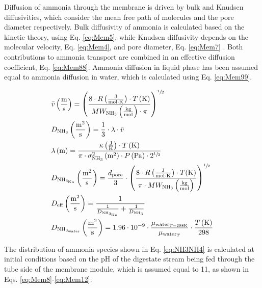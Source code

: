 \begin{refsection}[referencesApD]
Diffusion of ammonia through the membrane is driven by bulk and Knudsen diffusivities, which consider the mean free path of molecules and the pore diameter respectively. Bulk diffusivity of ammonia is calculated based on the kinetic theory, using Eq. \ref{eq:Mem5}, while Knudsen diffusivity depends on the molecular velocity, Eq. \ref{eq:Mem4}, and pore diameter, Eq. \ref{eq:Mem7} \citet{agrahari2012model}. Both contributions to ammonia transport are combined in an effective diffusion coefficient, Eq. \ref{eq:Mem88}. Ammonia diffusion in liquid phase has been assumed equal to ammonia diffusion in water, which is calculated using Eq. \ref{eq:Mem99}. 

\begin{align}
& \bar{v}  \left(\frac{\text{m}}{\text{s}}\right) = \left(\frac{8 \cdot R\left(\frac{\text{J}}{\text{mol} \cdot \text{K}}\right) \cdot T\left(\text{K}\right)}{MW_{\text{NH}_3} \left(\frac{\text{kg}}{\text{mol}}\right) \cdot \pi} \right)^{\sfrac{1}{2}}
\label{eq:Mem4} 
\\
& D_{\text{NH}_{3}}  \left(\frac{\text{m}^2}{\text{s}}\right) = \frac{1}{3} \cdot \lambda \cdot \bar{v}
\label{eq:Mem5} 
\\
& \lambda  \left(\text{m}\right) = \frac{\kappa \left(\frac{\text{J}}{\text{K}}\right) \cdot T\left(\text{K}\right)}{\pi \cdot \sigma_{\text{NH}_3}^2 \left(\text{m}^2\right) \cdot P\left(\text{Pa}\right) \cdot 2^{\sfrac{1}{2}}}
\label{eq:Mem6} 
\\
& D_{\text{NH}_{3_\text{Kn}}} \left(\frac{\text{m}^2}{\text{s}}\right) = \frac{d_{\text{pore}}}{3} \cdot \left(\frac{8 \cdot R\left(\frac{\text{J}}{\text{mol} \cdot \text{K}}\right) \cdot T(\text{K})} {\pi \cdot MW_{\text{NH}_3} \left(\frac{\text{kg}}{\text{mol}}\right)} \right)^{\sfrac{1}{2}}
\label{eq:Mem7}
\\
& D_{\text{eff}} \left(\frac{\text{m}^2}{\text{s}}\right) = \frac{1}{\frac{1}{D_{\text{NH}_{3_\text{Kn}}}} + \frac{1}{D_{\text{NH}_{3}}}}
\label{eq:Mem88}
\\
& D_{\text{NH}_{3_\text{water}}} \left(\frac{\text{m}^2}{\text{s}}\right) = 1.96 \cdot 10^{-9} \cdot \frac{\mu_{\text{water}_{T=298\text{K}}}}{\mu_{\text{water}_{T}}} \cdot \frac{T\left(\text{K}\right)}{298}
\label{eq:Mem99}
\end{align}

The distribution of ammonia species shown in Eq. \ref{eq:NH3NH4} is calculated at initial conditions based on the pH of the digestate stream being fed through the tube side of the membrane module, which is assumed equal to 11, as shown in Eqs. \ref{eq:Mem8}-\ref{eq:Mem12}.


\end{refsection}
